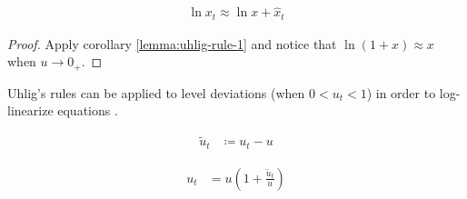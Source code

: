\documentclass[../thesis.tex]{subfiles}
\begin{document}

\begin{corollary}\label{uhlig-rule-4}
	\begin{align*}
		\ln x_t \approx \ln x + \hat{x}_t 
	\end{align*}
	\begin{proof} Apply corollary \ref{lemma:uhlig-rule-1} and notice that $\ln{(1+x)} \approx x$ when $u \to 0_{+}$. \end{proof}
\end{corollary}


\begin{definition}\label{eq:level-deviation}
	Uhlig's rules can be applied to level deviations (when $0<u_t<1$) in order to log-linearize equations \cite[Lecture 9, p.9]{solis-garcia_ucb_2022}.
\end{definition}

\begin{lemma} \label{lemma:level-rule-1a}
	\begin{align*}
		\widetilde{u}_t &\coloneq u_t - u
	\end{align*}
\end{lemma}

\begin{corollary} \label{lemma:level-rule-1b}
	\begin{align*}
		u_t &= u\left(1+ \frac{\widetilde{u}_t}{u} \right) 
	\end{align*}
\end{corollary}

\begin{comment}
	
\item Rule 2 (Product):

\item Rule 3 (Exponential):

\item Rule 4 (Logarithm):

\item Rule 5 (Percentage and Level Deviations)
	
	
\end{comment}
\end{document}
